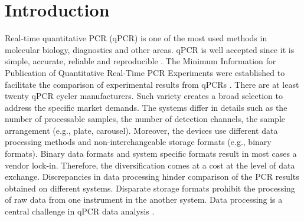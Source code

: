 \documentclass{bioinfo}
\begin{document}
\section{Introduction}
  Real-time quantitative PCR (qPCR) is one of the most used methods in molecular 
biology, diagnostics and other areas. qPCR is well accepted since 
it is simple, accurate, reliable and reproducible \cite{pabinger_2014}. The 
Minimum Information for Publication of Quantitative Real-Time PCR Experiments
were established to facilitate the comparison of experimental results from qPCRs 
\cite{huggett_2013}. There are at least twenty qPCR cycler manufacturers. Such variety creates a broad selection to 
address the specific market demands. The systems differ in details such as the 
number of processable samples, the number of detection channels, the sample 
arrangement (e.g., plate, carousel). Moreover, the devices use different 
data processing methods and non-interchangeable storage formats (e.g.,  binary formats). 
Binary data formats and system specific formats result in most cases a vendor 
lock-in. Therefore, the diversification comes at a cost at the level of data 
exchange. Discrepancies in data processing hinder comparison of the PCR results 
obtained on different systems. Disparate storage formats prohibit the processing 
of raw data from one instrument in the another system. Data processing is a 
central challenge in qPCR data analysis \cite{bustin_reproducibility_2014, roediger2015r, 
spiess_impact_2014, spiess_system-specific_2016}.
\end{document}
